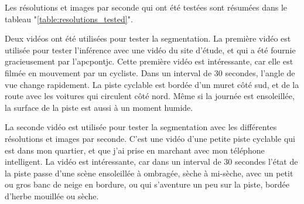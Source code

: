 \par Les résolutions et images par seconde qui ont été testées sont résumées dans le tableau "\ref{table:resolutions_tested}". 
\par Deux vidéos ont été utilisées pour tester la segmentation. La première vidéo est utilisée pour tester l'inférence avec une vidéo du site d'étude, et qui a été fournie gracieusement par l'\acrlong{apcpontjc}. Cette première vidéo est intéressante, car elle est filmée en mouvement par un cycliste. Dans un interval de 30 secondes, l'angle de vue change rapidement. La piste cyclable est bordée d'un muret côté sud, et de la route avec les voitures qui circulent côté nord. Même si la journée est ensoleillée, la surface de la piste est aussi à un moment humide.
\par La seconde vidéo est utilisée pour tester la segmentation avec les différentes résolutions et images par seconde. C'est une vidéo d'une petite piste cyclable qui est dans mon quartier, et que j'ai prise en marchant avec mon téléphone intelligent. La vidéo est intéressante, car dans un interval de 30 secondes l'état de la piste passe d'une scène ensoleillée à ombragée, sèche à mi-sèche, avec un petit ou gros banc de neige en bordure, ou qui s'aventure un peu sur la piste, bordée d'herbe mouillée ou sèche.